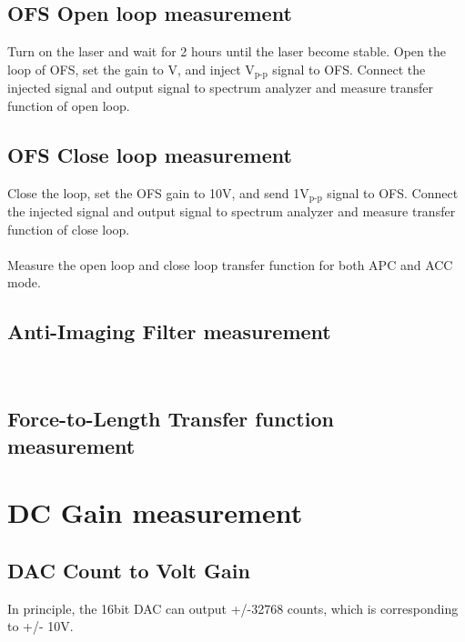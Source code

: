 \subsection{OFS Open loop measurement}
\label{OFS_OLTF}
Turn on the laser and wait for 2 hours until the laser become stable. Open the loop of OFS, set the gain to \underline{\qquad} V, and inject \underline{\qquad} $\mbox{V}_{\mbox{p-p}}$ signal to OFS. Connect the injected signal and output signal to spectrum analyzer and measure transfer function of open loop.
\subsection{OFS Close loop measurement}
Close the loop, set the OFS gain to 10V, and send 1$\mbox{V}_{\mbox{p-p}}$ signal to OFS. Connect the injected signal and output signal to spectrum analyzer and measure transfer function of close loop.
\\\\
\noindent Measure the open loop and close loop transfer function for both APC and ACC mode.

\subsection{Anti-Imaging Filter measurement}
     \\
    
\subsection{Force-to-Length Transfer function measurement}
\section{DC Gain measurement}
\subsection{DAC Count to Volt Gain}
    In principle, the 16bit DAC can output +/-32768 counts, which is corresponding to +/- 10V. 
